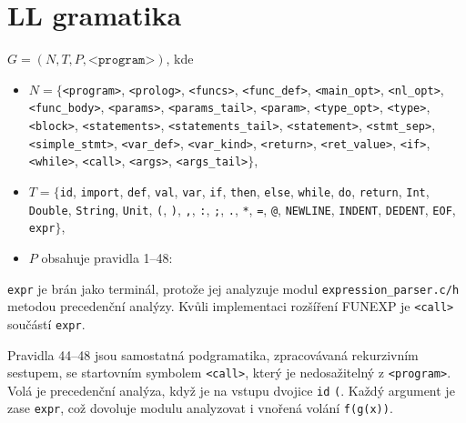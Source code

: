 \section{LL gramatika}
\label{app:gramatika}

$G = (N, T, P, \texttt{<program>})$, kde
\begin{itemize}\raggedright
  \item $N = \{$\texttt{<program>}, \texttt{<prolog>}, \texttt{<funcs>}, \texttt{<func\_def>}, \texttt{<main\_opt>}, \texttt{<nl\_opt>}, \texttt{<func\_body>}, \texttt{<params>}, \texttt{<params\_tail>}, \texttt{<param>}, \texttt{<type\_opt>}, \texttt{<type>}, \texttt{<block>}, \texttt{<statements>}, \texttt{<statements\_tail>}, \texttt{<statement>}, \texttt{<stmt\_sep>}, \texttt{<simple\_stmt>}, \texttt{<var\_def>}, \texttt{<var\_kind>}, \texttt{<return>}, \texttt{<ret\_value>}, \texttt{<if>}, \texttt{<while>}, \texttt{<call>}, \texttt{<args>}, \texttt{<args\_tail>}$\}$,
  \item $T = \{$\texttt{id}, \texttt{import}, \texttt{def}, \texttt{val}, \texttt{var}, \texttt{if}, \texttt{then}, \texttt{else}, \texttt{while}, \texttt{do}, \texttt{return}, \texttt{Int}, \texttt{Double}, \texttt{String}, \texttt{Unit}, \texttt{(}, \texttt{)}, \texttt{,}, \texttt{:}, \texttt{;}, \texttt{.}, \texttt{*}, \texttt{=}, \texttt{@}, \texttt{NEWLINE}, \texttt{INDENT}, \texttt{DEDENT}, \texttt{EOF}, \texttt{expr}$\}$,
  \item $P$ obsahuje pravidla 1--48:
\end{itemize}

\texttt{expr} je brán jako terminál, protože jej analyzuje modul \texttt{expression\_parser.c/h} metodou precedenční analýzy. Kvůli implementaci rozšíření FUNEXP je \texttt{<call>} součástí \texttt{expr}. 

Pravidla 44--48 jsou samostatná podgramatika, zpracovávaná rekurzivním sestupem, se startovním symbolem \texttt{<call>}, který je nedosažitelný z \texttt{<program>}. Volá je precedenční analýza, když je na vstupu dvojice \texttt{id} \texttt{(}. Každý argument je zase \texttt{expr}, což dovoluje modulu analyzovat i vnořená volání \texttt{f(g(x))}.

